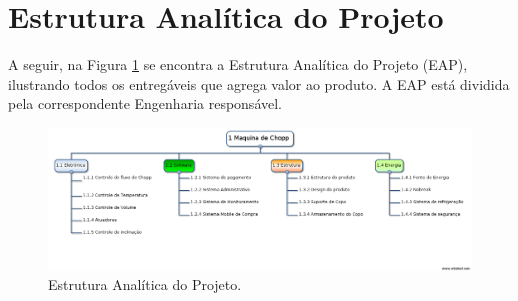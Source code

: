 \section{Estrutura Analítica do Projeto}

A seguir, na Figura \ref{eap} se encontra a Estrutura Analítica do Projeto (EAP), ilustrando todos os entregáveis que agrega valor ao produto. A EAP está dividida pela correspondente Engenharia responsável.

\begin{figure}[!hb]
    \centering
    \includegraphics[scale=0.4]{figuras/eap.png}
    \caption{Estrutura Analítica do Projeto.}
    \label{eap}
\end{figure}